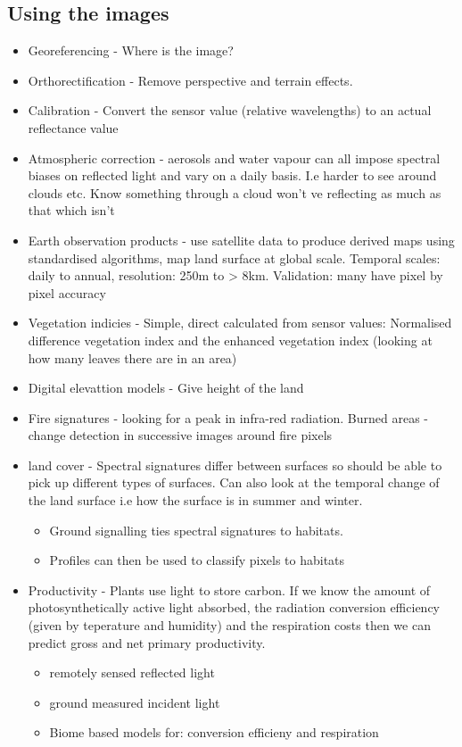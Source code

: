 \documentclass[11pt]{article}
\begin{document}
\subsection{Using the images}
\begin{itemize}
\item Georeferencing - Where is the image?
\item Orthorectification - Remove perspective and terrain effects. 
\item Calibration - Convert the sensor value (relative wavelengths) to an actual reflectance value
\item Atmospheric correction - aerosols and water vapour can all impose spectral biases on reflected light and vary on a daily basis. I.e harder to see around clouds etc. Know something through a cloud won't ve reflecting as much as that which isn't
\item Earth observation products - use satellite data to produce derived maps using standardised algorithms, map land surface at global scale. Temporal scales: daily to annual, resolution: 250m to > 8km. Validation: many have pixel by pixel accuracy
\item Vegetation indicies - Simple, direct calculated from sensor values: Normalised difference vegetation index and the enhanced vegetation index (looking at how many leaves there are in an area)
\item Digital elevattion models - Give height of the land
\item Fire signatures - looking for a peak in infra-red radiation. Burned areas - change detection in successive images around fire pixels
\item land cover - Spectral signatures differ between surfaces so should be able to pick up different types of surfaces. Can also look at the temporal change of the land surface i.e how the surface is in summer and winter. 
\begin{itemize}
\item Ground signalling ties spectral signatures to habitats.
\item Profiles can then be used to classify pixels to habitats
\end{itemize}
\item Productivity - Plants use light to store carbon. If we know the amount of photosynthetically active light absorbed, the radiation conversion efficiency (given by teperature and humidity) and the respiration costs then we can predict gross and net primary productivity.
\begin{itemize}
\item remotely sensed reflected light
\item ground measured incident light
\item Biome based models for: conversion efficieny and respiration
\end{itemize}

\end{itemize}
\end{document}
